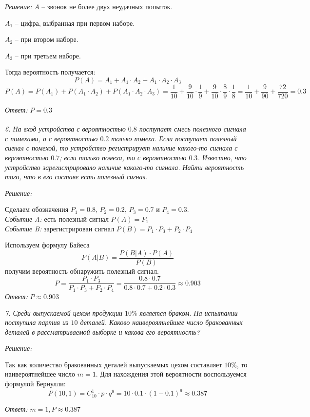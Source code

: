 \emph{Решение:}
\( A \) -- звонок не более двух неудачных попыток.

\( A_1 \) -- цифра, выбранная при первом наборе.

\( A_2 \) -- при втором наборе.

\( A_3 \) -- при третьем наборе.

Тогда вероятность получается:
\[ 
	P(A) = A_1 + A_1 \cdot A_2 + A_1 \cdot A_2 \cdot A_3 
\]
\[ 
	P(A) = P(A_1) + P(A_1 \cdot A_2) + P(A_1 \cdot A_2 \cdot A_3) = 
	\frac{1}{10} + \frac{9}{10}\cdot\frac{1}{9} + 
	\frac{9}{10}\cdot\frac{8}{9}\cdot\frac{1}{8} = 
	\frac{1}{10} + \frac{9}{90} + \frac{72}{720} = 0.3
\]

\emph{Ответ: } \( P = 0.3 \) \\\\


\emph{6. На вход устройства с вероятностью \( 0.8 \) поступает смесь 
полезного сигнала с помехами, а с вероятностью \( 0.2 \) только помеха. 
Если поступает полезный сигнал с помехой, то устройство регистрирует 
наличие какого-то сигнала с вероятностью \( 0.7 \); если только помеха, то 
с вероятностью \( 0.3 \). Известно, что устройство зарегистрировало наличие 
какого-то сигнала. Найти вероятность того, что в его составе есть полезный 
сигнал.}

\emph{Решение:}

Сделаем обозначения \( P_1 = 0.8 \), \( P_2 = 0.2 \), \( P_3 = 0.7 \) и 
\( P_4 = 0.3 \). \\
\emph{Событие A:} есть полезный сигнал \( P(A) = P_1 \) \\
\emph{Событие B:} зарегистрирован сигнал 
\( P(B) = P_1 \cdot P_3 + P_2 \cdot P_4 \)

Используем формулу Байеса
\[ 
	P(A|B) = \frac{P(B|A)\cdot P(A)}{P(B)}
\]
получим вероятность обнаружить полезный сигнал.
\[ 
	P = \frac{P_1 \cdot P_3}{ P_1 \cdot P_3 + P_2 \cdot P_4} 
	= \frac{ 0.8 \cdot 0.7 }{ 0.8 \cdot 0.7 + 0.2 \cdot 0.3}
	\approx 0.903
\]
\emph{Ответ: } \( P \approx 0.903 \)

\newpage


\emph{7. Среди выпускаемой цехом продукции \( 10\% \) является браком. На 
испытании поступила партия из \( 10 \) деталей. Каково наивероятнейшее число 
бракованных деталей в рассматриваемой выборке и какова его вероятность?}

\emph{Решение:}

Так как количество бракованных деталей выпускаемых цехом составляет 
\( 10\% \), то наивероятнейшее число \( m = 1 \). Для нахождения этой 
вероятности воспользуемся формулой Бернулли:
\[
	P(10, 1) = C^{1}_{10} \cdot p \cdot q^{9} = 
	10 \cdot 0.1 \cdot ( 1 - 0.1 )^{9} \approx 0.387
\]

\emph{Ответ: } \( m = 1, P \approx 0.387 \) \\\\


